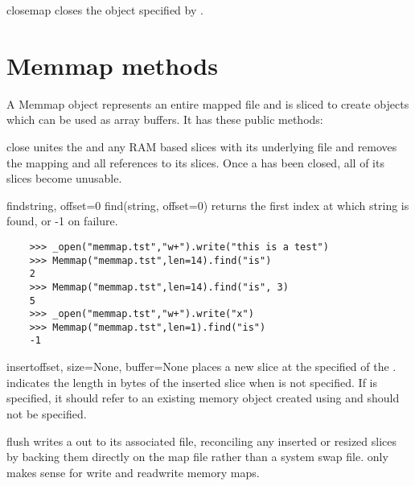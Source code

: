 \begin{funcdesc}{close}{map}
\label{func:memmap-close}
 closes the  object specified by
.
\end{funcdesc}
   
\section{Memmap methods}
\label{sec:memmap-methods}
A Memmap object represents an entire mapped file and is sliced to
create objects which can be used as array buffers.  It has these
public methods:

\begin{methoddesc}[Memmap]{close}{}
   unites the  and any RAM based slices with
  its underlying file and removes the mapping and all references to
  its slices.  Once a  has been closed, all of its
  slices become unusable.
\end{methoddesc}

\begin{methoddesc}[Memmap]{find}{string, offset=0}
  find(string, offset=0) returns the first index at which string
  is found, or -1 on failure.
  \begin{verbatim}
    >>> _open("memmap.tst","w+").write("this is a test")
    >>> Memmap("memmap.tst",len=14).find("is")
    2
    >>> Memmap("memmap.tst",len=14).find("is", 3)
    5
    >>> _open("memmap.tst","w+").write("x")
    >>> Memmap("memmap.tst",len=1).find("is")
    -1
  \end{verbatim}
\end{methoddesc}

\begin{methoddesc}[Memmap]{insert}{offset, size=None, buffer=None}
   places a new slice at the specified  of
  the .   indicates the length in bytes of the
  inserted slice when  is not specified.  If 
  is specified, it should refer to an existing memory object created
  using  and  should not
  be specified.
\end{methoddesc}

\begin{methoddesc}[Memmap]{flush}{}
   writes a  out to its associated file,
  reconciling any inserted or resized slices by backing them directly
  on the map file rather than a system swap file.  
  only makes sense for write and readwrite memory maps.
\end{methoddesc}

